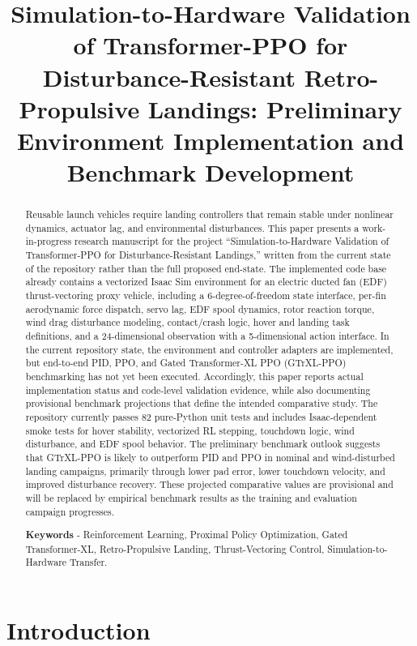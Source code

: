 \documentclass[10pt,twocolumn]{article}
\title{Simulation-to-Hardware Validation of Transformer-PPO for Disturbance-Resistant Retro-Propulsive Landings: Preliminary Environment Implementation and Benchmark Development}
\author{}
\date{}
\begin{document}
\maketitle

\begin{abstract}
Reusable launch vehicles require landing controllers that remain stable under nonlinear dynamics, actuator lag, and environmental disturbances. This paper presents a work-in-progress research manuscript for the project ``Simulation-to-Hardware Validation of Transformer-PPO for Disturbance-Resistant Landings,'' written from the current state of the repository rather than the full proposed end-state. The implemented code base already contains a vectorized Isaac Sim environment for an electric ducted fan (EDF) thrust-vectoring proxy vehicle, including a 6-degree-of-freedom state interface, per-fin aerodynamic force dispatch, servo lag, EDF spool dynamics, rotor reaction torque, wind drag disturbance modeling, contact/crash logic, hover and landing task definitions, and a 24-dimensional observation with a 5-dimensional action interface. In the current repository state, the environment and controller adapters are implemented, but end-to-end PID, PPO, and Gated Transformer-XL PPO (GTrXL-PPO) benchmarking has not yet been executed. Accordingly, this paper reports actual implementation status and code-level validation evidence, while also documenting provisional benchmark projections that define the intended comparative study. The repository currently passes 82 pure-Python unit tests and includes Isaac-dependent smoke tests for hover stability, vectorized RL stepping, touchdown logic, wind disturbance, and EDF spool behavior. The preliminary benchmark outlook suggests that GTrXL-PPO is likely to outperform PID and PPO in nominal and wind-disturbed landing campaigns, primarily through lower pad error, lower touchdown velocity, and improved disturbance recovery. These projected comparative values are provisional and will be replaced by empirical benchmark results as the training and evaluation campaign progresses.

\textbf{Keywords} - Reinforcement Learning, Proximal Policy Optimization, Gated Transformer-XL, Retro-Propulsive Landing, Thrust-Vectoring Control, Simulation-to-Hardware Transfer.
\end{abstract}

\section{Introduction}
\end{document}
